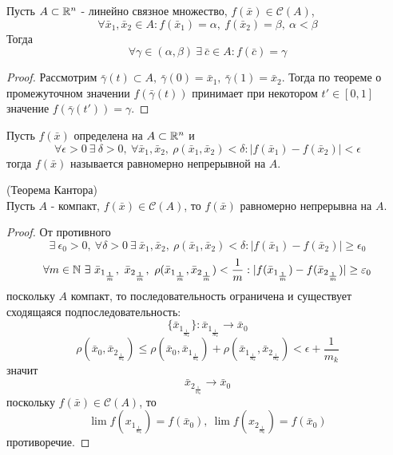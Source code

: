 \begin{theorem}
    Пусть $A\subset \mathbb{R}^n$ - линейно связное множество, $f(\bar{x})\in \mathcal{C}(A)$,
    \[\forall \bar{x}_1, \bar{x}_2\in A: f(\bar{x}_1)=\alpha,\ f(\bar{x}_2)=\beta,\ \alpha<\beta\]
    Тогда
    \[\forall \gamma\in (\alpha, \beta)\ \exists\ \bar{c}\in A: f(\bar{c})=\gamma\]
\end{theorem} 
\begin{proof}
    Рассмотрим $\bar{\gamma}(t)\subset A,\ \bar{\gamma}(0)=\bar{x}_1,\ \bar{\gamma}(1)=\bar{x}_2$. Тогда по теореме о промежуточном значении $f(\bar{\gamma}(t))$ принимает при некотором $t'\in [0,1]$ значение $f(\bar{\gamma}(t'))=\gamma$.
\end{proof} 
\begin{definition}
    Пусть $f(\bar{x})$ определена на $A\subset \mathbb{R}^n$ и
    \[\forall \epsilon>0\ \exists\ \delta>0,\ \forall \bar{x}_1, \bar{x}_2,\ \rho(\bar{x}_1, \bar{x}_2)<\delta: |f(\bar{x}_1)-f(\bar{x}_2)|<\epsilon\] 
    тогда $f(\bar{x})$ называется равномерно непрерывной на $A$.
\end{definition} 
\begin{theorem} (Теорема Кантора)\\
    Пусть $A$ - компакт, $f(\bar{x})\in \mathcal{C}(A)$, то $f(\bar{x})$ равномерно непрерывна на $A$.
\end{theorem} 
\begin{proof}
    От противного 
    \[\exists\ \epsilon_0>0,\ \forall \delta>0\ \exists\ \bar{x}_{1}, \bar{x}_2,\ \rho(\bar{x}_1, \bar{x}_2)<\delta: |f(\bar{x}_1)-f(\bar{x}_2)|\geq \epsilon_0\]
    \[\forall m\in \N\ \exists\ \bar{x}_{1_{\frac{1}{m}}},\ \bar{x}_{2_{\frac{1}{m}}},\ \rho(\bar{x}_{1_{\frac{1}{m}}}, \bar{x}_{2_{\frac{1}{m}}})<\frac{1}{m}: |f(\bar{x}_{1_{\frac{1}{m}}})-f(\bar{x}_{2_{\frac{1}{m}}})|\geq \epsilon_0\]
    поскольку $A$ компакт, то последовательность ограничена и существует сходящаяся подпоследовательность:
    \[\{\bar{x}_{1_{\frac{1}{m_k}}}\}: \bar{x}_{1_{\frac{1}{m_k}}}\to \bar{x}_0\]
    \[\rho(\bar{x}_0, \bar{x}_{2_{\frac{1}{m_k}}})\leq \rho(\bar{x}_0, \bar{x}_{1_{\frac{1}{m_k}}})+\rho(\bar{x}_{1_{\frac{1}{m_k}}}, \bar{x}_{2_{\frac{1}{m_k}}})<\epsilon+\frac{1}{m_k}\]
    значит 
    \[\bar{x}_{2_{\frac{1}{m_k}}}\to \bar{x}_0\]
    поскольку $f(\bar{x})\in \mathcal{C}(A)$, то
    \[\lim\limits f(x_{1_{\frac{1}{m_k}}})=f(\bar{x}_0),\ \lim\limits f(x_{2_{\frac{1}{m_k}}})=f(\bar{x}_0)\]
    противоречие.
\end{proof} 
